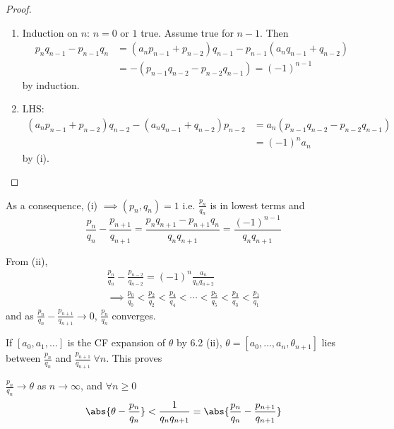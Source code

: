 \documentclass{article}
\begin{document}
\begin{proof}
    \begin{enumerate}[label=(\roman*)]
        \item Induction on $n$: $n=0$ or $1$ true.
            Assume true for $n-1$. Then
            \begin{align*}
                p_n q_{n-1} - p_{n-1} q_n &= (a_n p_{n-1} + p_{n-2}) q_{n-1} - p_{n-1} (a_n q_{n-1} + q_{n-2}) \\
                                          &= -(p_{n-1} q_{n-2} - p_{n-2} q_{n-1}) = (-1)^{n-1}
            \end{align*}
            by induction.
        \item LHS:
            \begin{align*}
                (a_n p_{n-1} + p_{n-2}) q_{n-2} - (a_n q_{n-1} + q_{n-2}) p_{n-2} &= a_n (p_{n-1} q_{n-2} - p_{n-2} q_{n-1}) \\
                                                                                  &= (-1)^n a_n
            \end{align*}
            by (i).
    \end{enumerate}
\end{proof}

\begin{remark}
    As a consequence,
    (i) $\implies (p_n, q_n) = 1$ i.e. $\frac{p_n}{q_n}$ is in lowest terms and
    \begin{equation*}
        \frac{p_n}{q_n} - \frac{p_{n+1}}{q_{n+1}} = \frac{p_n q_{n+1} - p_{n+1} q_n}{q_n q_{n+1}} = \frac{(-1)^{n-1}}{q_n q_{n+1}}
    \end{equation*}

    From (ii),
    \begin{gather}
        \frac{p_n}{q_n} - \frac{p_{n-2}}{q_{n-2}} = (-1)^n \frac{a_n}{q_n q_{n+2}} \\
        \implies \frac{p_0}{q_0} < \frac{p_2}{q_2} < \frac{p_4}{q_4} < \dotsb < \frac{p_5}{q_5} < \frac{p_3}{q_3} < \frac{p_1}{q_1}
    \end{gather}
    and as $\frac{p_n}{q_n} - \frac{p_{n+1}}{q_{n+1}} \to 0$, $\frac{p_n}{q_n}$ converges.

    If $[a_0, a_1, \dotsc]$ is the CF expansion of $\theta$ by 6.2 (ii), $\theta = [a_0, \dotsc, a_n, \theta_{n+1}]$ lies between $\frac{p_n}{q_n}$ and $\frac{p_{n+1}}{q_{n+1}} \ \forall n$.
    This proves
\end{remark}

\begin{nthm}\label{thm:6.4}
    $\frac{p_n}{q_n} \to \theta$ as $n \to \infty$, and $\forall n \geq 0$
    \begin{equation*}
        \abs{\theta - \frac{p_n}{q_n}} < \frac{1}{q_n q_{n+1}} = \abs{\frac{p_n}{q_n} - \frac{p_{n+1}}{q_{n+1}}}
    \end{equation*}
\end{nthm}
\end{document}
